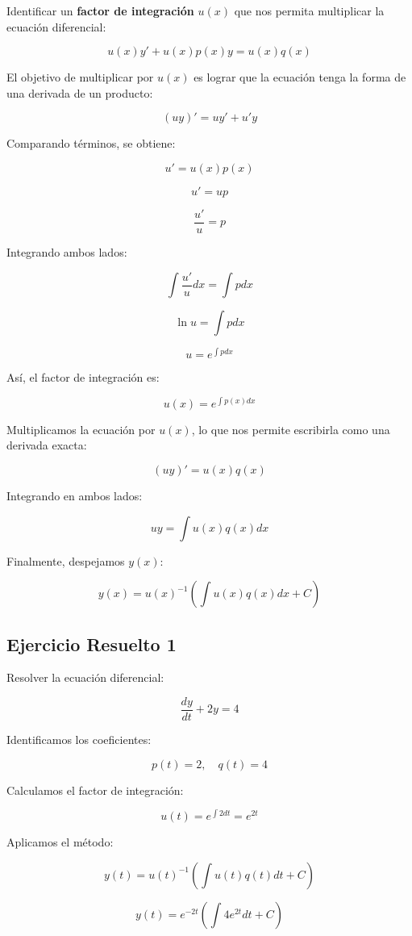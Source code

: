 Identificar un \textbf{factor de integración} \( u(x) \) que nos permita multiplicar la ecuación diferencial:

\[
u( x) y' + u( x) p( x) y = u( x) q( x)
\]

El objetivo de multiplicar por \( u(x) \) es lograr que la ecuación tenga la forma de una derivada de un producto:

\[
(u y)' = u y' + u' y
\]

Comparando términos, se obtiene:

\[
u' = u( x) p( x)
\]

\[
u' = up
\]

\[
\frac{u'}{u} = p
\]

Integrando ambos lados:

\[
\int \frac{u'}{u} dx = \int p dx
\]

\[
\ln u = \int p dx
\]

\[
u = e^{\int p dx}
\]

Así, el factor de integración es:

\[
u( x) = e^{\int p( x) dx}
\]

Multiplicamos la ecuación por \( u(x) \), lo que nos permite escribirla como una derivada exacta:

\[
( u y)' = u( x) q( x)
\]

Integrando en ambos lados:

\[
u y = \int u( x) q( x) dx
\]

Finalmente, despejamos \( y(x) \):

\[
y( x) = u( x)^{-1} \left(\int u( x) q( x) dx + C\right)
\]


\subsection{Ejercicio Resuelto 1}

Resolver la ecuación diferencial:

\[
\frac{dy}{dt} +2y = 4
\]

Identificamos los coeficientes:

\[
p(t) = 2, \quad q(t) = 4
\]

Calculamos el factor de integración:

\[
u(t) = e^{\int 2dt} = e^{2t}
\]

Aplicamos el método:

\[
y(t) = u(t)^{-1} \left(\int u(t) q(t) dt +C\right)
\]

\[
y(t) = e^{-2t} \left(\int 4e^{2t} dt +C\right)
\]

